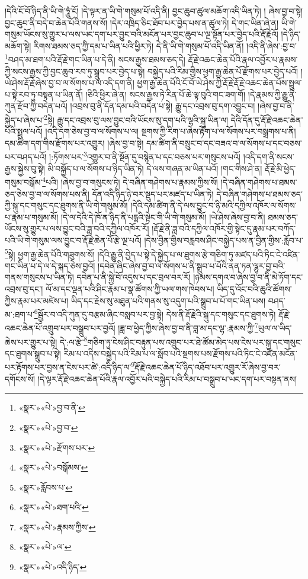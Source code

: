 །དེའི་ངོ་བོ་ཉིད་ནི་ཡི་གེ་ཧཱུཾ་ངོ། །དེ་ལྟར་ན་ཡི་གེ་གསུམ་པོ་འདི་ནི། བྱང་ཆུབ་ཚུལ་མཆོག་འདི་ཡིན་ཏེ། །
ཞེས་བྱ་བ་སྟེ། བྱང་ཆུབ་ནི་བདེ་བ་ཆེན་པོའི་གནས་སོ། །དེར་འཁྲིད་ཅིང་ཐོབ་པར་བྱེད་པས་ན་ཚུལ་ཏེ། དེ་གང་ཡིན་ཞེ་ན། ཡི་གེ་གསུམ་ཡོངས་སུ་གྱུར་པ་ལས་ཡང་དག་པར་བྱུང་བའི་མངོན་པར་བྱང་ཆུབ་པ་ལྔ་སྟོན་པར་བྱེད་པའི་རྡོ་རྗེའོ། །དེ་ཉིད་མཆོག་སྟེ། རིགས་ཐམས་ཅད་ཀྱི་དམ་པ་ཡིན་པའི་ཕྱིར་ཏེ། དེ་ནི་ཡི་གེ་གསུམ་པོ་འདི་ཡིན་ནོ། །འདི་ནི་ཞེས་:བྱ་བ་\footnote{«སྣར་»«པེ་»བྱ་བ་ནི་}བཤད་མ་ཐག་པའི་རྡོ་རྗེ་གང་ཡིན་པ་དེ་ནི། སངས་རྒྱས་ཐམས་ཅད་དེ། རྡོ་རྗེ་འཆང་ཆེན་པོའི་རྣལ་འབྱོར་པ་རྣམས་ཀྱི་སངས་རྒྱས་ཀྱི་བྱང་ཆུབ་རབ་ཏུ་སྒྲུབ་པར་བྱེད་པ་སྟེ། བསྐྱེད་པའི་རིམ་གྱིས་ཕྱག་རྒྱ་ཆེན་པོ་རྫོགས་པར་བྱེད་པའོ། །ཡེ་ཤེས་རྡོ་རྗེ་ཞེས་བྱ་བ་ལ་སོགས་པ་ལ་འདི་དག་ནི། ཕྱག་རྒྱ་ཆེན་པོའི་ངོ་བོ་ཡེ་ཤེས་ཀྱི་རྡོ་རྗེ་རྡོ་རྗེ་འཆང་ཆེན་པོས་སྤྲུལ་པ་སྟེ་རབ་ཏུ་བསྟན་པ་ཡིན་ནོ། །ཅིའི་ཕྱིར་ཞེ་ན། སངས་རྒྱས་ཏེ་རིན་པོ་ཆེ་ལྟ་བུའི་གང་ཟག་གོ། །དེ་རྣམས་ཀྱི་རྒྱུ་ནི་ཀུན་རྫོབ་ཀྱི་བདེན་པའོ། །འབྲས་བུ་ནི་དོན་དམ་པའི་བདེན་པ་སྟེ། རྒྱུ་དང་འབྲས་བུ་དག་འབྱུང་བ། །ཞེས་བྱ་བ་ནི་སྐྱེད་པ་ཞེས་པ་\footnote{«སྣར་»«པེ་»བྱ་བ་}སྟེ། རྒྱུ་དང་འབྲས་བུ་ལས་བྱུང་བའི་ཡོངས་སུ་དག་པའི་ལྷའི་སྐུ་ཡིན་ལ། དེའི་དོན་དུ་རྡོ་རྗེ་འཆང་ཆེན་པོའི་སྤྲུལ་པའོ། །འདི་དག་ཅེས་བྱ་བ་ལ་སོགས་པ་ལ། སྔགས་ཀྱི་རིག་པ་ཞེས་རྟོག་པ་ལ་སོགས་པར་བསྒྲགས་པ་ནི། དམ་ཚིག་དག་གིས་རྫོགས་པར་འགྱུར། །ཞེས་བྱ་བ་སྟེ། དམ་ཚིག་ནི་བསྲུང་བ་དང་བཟའ་བ་ལ་སོགས་པ་དང་བཅས་པར་བཤད་པའོ། །:ཏོགས་པར་\footnote{«སྣར་»«པེ་»རྫོགས་པར་}འགྱུར་བ་ནི་སྔོན་དུ་བསྙེན་པ་དང་བཅས་པར་གསུངས་པའོ། །འདི་དག་ནི་སངས་རྒྱས་སྐྱེས་བུ་སྟེ། མི་བསྐྱོད་པ་ལ་སོགས་པ་ཉིད་ཡིན་ཏེ། དེ་ལས་གཞན་མ་ཡིན་པའོ། །གང་གིས་ཤེ་ན། རྡོ་རྗེ་མི་ཕྱེད་གསུམ་བསྒོམ་\footnote{«སྣར་»«པེ་»བསྒོམས་}པའི། །ཞེས་བྱ་བ་གསུངས་ཏེ། དེ་བཞིན་གཤེགས་པ་རྣམས་ཀྱིས་སོ། །དེ་བཞིན་གཤེགས་པ་ཐམས་ཅད་ཅེས་བྱ་བ་ལ་སོགས་པས་ནི། དོན་འདི་ཉིད་ཉེ་བར་སྡུད་པར་མཛད་པ་ཡིན་ཏེ། དེ་བཞིན་གཤེགས་པ་ཐམས་ཅད་ཀྱི་སྐུ་དང་གསུང་དང་ཐུགས་ནི་ཡི་གེ་གསུམ་མོ། །དེའི་དམ་ཚིག་ནི་དེ་ལས་བྱུང་བ་ཉི་མའི་དཀྱིལ་འཁོར་ལ་སོགས་པ་རྣམ་པ་གསུམ་མོ། །དེ་ལ་དེའི་དེ་ཁོ་ན་ཉིད་ནི་པདྨའི་སྟེང་གི་ཡི་གེ་གསུམ་མོ། །ཡེ་ཤེས་ཞེས་བྱ་བ་ནི། ཐམས་ཅད་ཡོངས་སུ་གྱུར་པ་ལས་བྱུང་བའི་ཟླ་བའི་དཀྱིལ་འཁོར་རོ། །རྡོ་རྗེ་ནི་ཟླ་བའི་དཀྱིལ་འཁོར་གྱི་སྟེང་དུ་རྣམ་པར་བཀོད་པའི་ཡི་གེ་གསུམ་ལས་བྱུང་བ་རྡོ་རྗེ་ཆེན་པོ་རྩེ་ལྔ་པའོ། །དེས་བྱིན་གྱིས་བརླབས་ཤིང་བསྐྱེད་པས་ན་བྱིན་གྱིས་:རློབ་པ་\footnote{«སྣར་»རློབས་པ་}སྟེ། ཕྱག་རྒྱ་ཆེན་པོའི་གཟུགས་སོ། །དེའི་རྒྱུ་ནི་བྱེད་པ་སྟེ་དེ་སྐྱེད་པ་ལ་ཐུགས་རྩེ་གཅིག་ཏུ་མཛད་པའི་ཏིང་ངེ་འཛིན་གང་ཡིན་པ་དེ་ལ་དེ་སྐད་ཅེས་བྱའོ། །དབེན་ཞིང་ཞེས་བྱ་བ་ལ་སོགས་པ་ནི་སྒྲུབ་པ་པོའི་ནན་ཏན་ལྷུར་བྱ་བའི་གནས་གསུངས་པ་ཡིན་ཏེ། དབེན་པ་ནི་སྐྱེ་བོ་འདུས་པ་དང་བྲལ་བར་རོ། །ཉམས་དགའ་བ་ཞེས་བྱ་བ་ནི་མེ་ཏོག་དང་འབྲས་བུ་དང་། ལོ་མ་དང་ལྡན་པའི་ཤིང་རྣམ་པ་སྣ་ཚོགས་ཀྱི་ཡལ་གས་ཁེབས་པ། ཡིད་དུ་འོང་བའི་ཆུའི་ཚོགས་ཀྱིས་རྣམ་པར་མཛེས་པ། ཡིད་དང་རྗེས་སུ་མཐུན་པའི་གནས་སུ་འདུག་པའི་སྒྲུབ་པ་པོ་གང་ཡིན་པས། བཤད་མ་:ཐག་པ་\footnote{«སྣར་»«པེ་»ཐག་པའི་}སྦྱོར་བ་འདི་ཀུན་དུ་བརྩམ་ཞིང་བསླབ་པར་བྱ་སྟེ། དེས་ནི་རྡོ་རྗེའི་སྐུ་དང་གསུང་དང་ཐུགས་ཏེ། རྡོ་རྗེ་འཆང་ཆེན་པོ་འགྲུབ་པར་བསྒྲུབ་པར་བྱའོ། །ཟླ་བ་ཕྱེད་ཀྱིས་ཞེས་བྱ་བ་ནི་བླ་མ་དང་ལྷ་:རྣམས་ཀྱི་\footnote{«སྣར་»«པེ་»རྣམས་ཀྱིས་}ཡུལ་ལ་ཡིད་ཆེས་པར་གྱུར་པ་སྟེ། དེ་:ལ་རྩེ་\footnote{«སྣར་»«པེ་»ལ་}གཅིག་ཏུ་ངེས་ཤིང་བརྟུན་པས་འགྲུབ་པར་ཐེ་ཚོམ་མེད་པས་ངེས་པར་སྐུ་དང་གསུང་དང་ཐུགས་སྒྲུབ་པ་སྟེ། རིམ་པ་འདིས་བསྐྱེད་པའི་རིམ་པ་ལ་སློབ་པའི་སྔགས་པས་རྫོགས་པའི་ཏིང་ངེ་འཛིན་མངོན་པར་རྟོགས་པར་བྱས་ན་ངེས་པར་ཚེ་:འདི་ཉིད་ལ་\footnote{«སྣར་»«པེ་»འདི་ཉིད་}རྡོ་རྗེ་འཆང་ཆེན་པོ་ཉིད་འཐོབ་པར་འགྱུར་རོ་ཞེས་བྱ་བར་དགོངས་སོ། །དེ་ལྟར་རྡོ་རྗེ་འཆང་ཆེན་པོའི་རྣལ་འབྱོར་པའི་བསྐྱེད་པའི་རིམ་པ་བསྒྲུབ་པ་ཡང་དག་པར་བསྟན་ནས། 